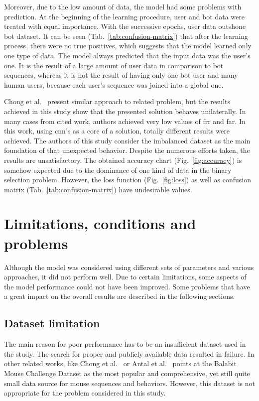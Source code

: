 Moreover, due to the low amount of data, the model had some problems with prediction.
At the beginning of the learning procedure, user and bot data were treated with equal importance.
With the successive epochs, user data outshone bot dataset.
It can be seen \mbox{(Tab.~\ref{tab:confusion-matrix})} that after the learning process, there were no true positives, which suggests that the model learned only one type of data.
The model always predicted that the input data was the user's one.
It is the result of a large amount of user data in comparison to bot sequences, whereas it is not the result of having only one bot user and many human users, because each user's sequence was joined into a global one.

Chong et al.~\cite{Main} present similar approach to related problem, but the results achieved in this study show that the presented solution behaves unilaterally.
In many cases from cited work, authors achieved very low values of \gls{frr} and \gls{far}.
In this work, using \gls{cnn}'s as a core of a solution, totally different results were achieved.
The authors of this study consider the imbalanced dataset as the main foundation of that unexpected behavior.
Despite the numerous efforts taken, the results are unsatisfactory.
The obtained accuracy chart (Fig.~\ref{fig:accuracy}) is somehow expected due to the dominance of one kind of data in the binary selection problem.
However, the loss function (Fig.~\ref{fig:loss}) as well as confusion matrix (Tab.~\ref{tab:confusion-matrix}) have undesirable values.


\section{Limitations, conditions and problems}\label{sec:limitations-conditions-problems}
Although the model was considered using different sets of parameters and various approaches, it did not perform well.
Due to certain limitations, some aspects of the model performance could not have been improved.
Some problems that have a great impact on the overall results are described in the following sections.

\subsection{Dataset limitation}\label{subsec:dataset-limitation}
The main reason for poor performance has to be an insufficient dataset used in the study.
The search for proper and publicly available data resulted in failure.
In other related works, like Chong et al.~\cite{Main} or Antal et al.~\cite{antal2019intrusion} points at the Balabit Mouse Challenge Dataset as the most popular and comprehensive, yet still quite small data source for mouse sequences and behaviors.
However, this dataset is not appropriate for the problem considered in this study.

